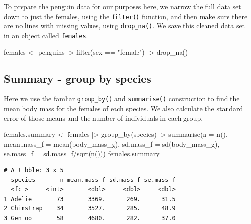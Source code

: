 \documentclass[
  letterpaper,
  DIV=11,
  numbers=noendperiod]{scrreprt}
\newenvironment{Shaded}{\begin{snugshade}}{\end{snugshade}}
\newcommand{\AttributeTok}[1]{\textcolor[rgb]{0.40,0.45,0.13}{#1}}
\newcommand{\FunctionTok}[1]{\textcolor[rgb]{0.28,0.35,0.67}{#1}}
\newcommand{\NormalTok}[1]{\textcolor[rgb]{0.00,0.23,0.31}{#1}}
\newcommand{\OtherTok}[1]{\textcolor[rgb]{0.00,0.23,0.31}{#1}}
\newcommand{\SpecialCharTok}[1]{\textcolor[rgb]{0.37,0.37,0.37}{#1}}
\newcommand{\StringTok}[1]{\textcolor[rgb]{0.13,0.47,0.30}{#1}}
\begin{document}
To prepare the penguin data for our purposes here, we narrow the full
data set down to just the females, using the \texttt{filter()} function,
and then make sure there are no lines with missing values, using
\texttt{drop\_na()}. We save this cleaned data set in an object called
\texttt{females}.

\begin{Shaded}
\begin{Highlighting}[]
\NormalTok{females }\OtherTok{\textless{}{-}}\NormalTok{ penguins }\SpecialCharTok{|\textgreater{}}
  \FunctionTok{filter}\NormalTok{(sex }\SpecialCharTok{==} \StringTok{"female"}\NormalTok{) }\SpecialCharTok{|\textgreater{}}
  \FunctionTok{drop\_na}\NormalTok{()}
\end{Highlighting}
\end{Shaded}

\subsection{Summary - group by
species}\label{summary---group-by-species}

Here we use the famliar \texttt{group\_by()} and \texttt{summarise()}
construction to find the mean body mass for the females of each species.
We also calculate the standard error of those means and the number of
individuals in each group.

\begin{Shaded}
\begin{Highlighting}[]
\NormalTok{females.summary }\OtherTok{\textless{}{-}}\NormalTok{ females }\SpecialCharTok{|\textgreater{}}
  \FunctionTok{group\_by}\NormalTok{(species) }\SpecialCharTok{|\textgreater{}}
  \FunctionTok{summarise}\NormalTok{(}\AttributeTok{n =} \FunctionTok{n}\NormalTok{(),}
            \AttributeTok{mean.mass\_f =} \FunctionTok{mean}\NormalTok{(body\_mass\_g),}
            \AttributeTok{sd.mass\_f =} \FunctionTok{sd}\NormalTok{(body\_mass\_g),}
            \AttributeTok{se.mass\_f =}\NormalTok{ sd.mass\_f}\SpecialCharTok{/}\FunctionTok{sqrt}\NormalTok{(}\FunctionTok{n}\NormalTok{()))}
\NormalTok{females.summary }
\end{Highlighting}
\end{Shaded}

\begin{verbatim}
# A tibble: 3 x 5
  species       n mean.mass_f sd.mass_f se.mass_f
  <fct>     <int>       <dbl>     <dbl>     <dbl>
1 Adelie       73       3369.      269.      31.5
2 Chinstrap    34       3527.      285.      48.9
3 Gentoo       58       4680.      282.      37.0
\end{verbatim}
\end{document}

